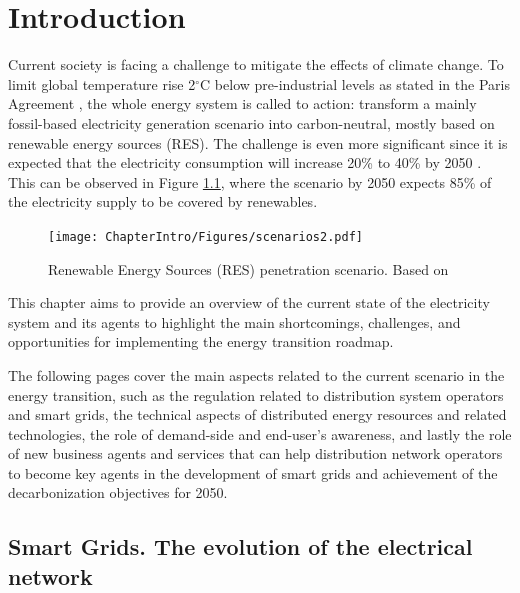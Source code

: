 \renewcommand\labelenumi{(\roman{enumi})}
\renewcommand\theenumi\labelenumi

\chapter{Introduction}
\label{chapterIntro}

Current society is facing a challenge to mitigate the effects of climate change. To limit global temperature rise 2$^{\circ}$C below pre-industrial levels as stated in the Paris Agreement \cite{IPCC2018}, the whole energy system is called to action: transform a mainly fossil-based electricity generation scenario into carbon-neutral, mostly based on renewable energy sources (RES). The challenge is even more significant since it is expected that the electricity consumption will increase 20\% to 40\% by 2050 \cite{IRENA2018}. This can be observed in Figure \ref{fig:scenarios}, where the scenario by 2050 expects 85\% of the electricity supply to be covered by renewables. 

\begin{figure}[htbp]
	\centering 
	\texttt{[image: ChapterIntro/Figures/scenarios2.pdf]}
		\caption{Renewable Energy Sources (RES) penetration scenario. Based on \cite{IRENA2018}}  
		\label{fig:scenarios}
\end{figure}
\newpage
This chapter aims to provide an overview of the current state of the electricity system and its agents to highlight the main shortcomings, challenges, and opportunities for implementing the energy transition roadmap. 

The following pages cover the main aspects related to the current scenario in the energy transition, such as the regulation related to distribution system operators and smart grids, the technical aspects of distributed energy resources and related technologies, the role of demand-side and end-user's awareness, and lastly the role of new business agents and services that can help distribution network operators to become key agents in the development of smart grids and achievement of the decarbonization objectives for 2050. 


\section{Smart Grids. The evolution of the electrical network}

